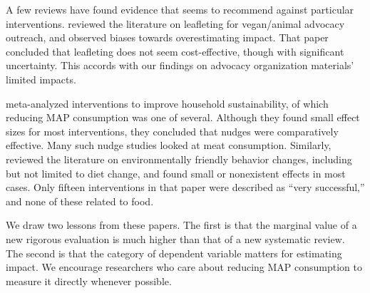 \documentclass[sn-nature,referee,pdflatex]{sn-jnl}
\begin{document}
A few reviews have found evidence that seems to recommend against
particular interventions. \citep{greig2017} reviewed the literature on
leafleting for vegan/animal advocacy outreach, and observed biases
towards overestimating impact. That paper concluded that leafleting does
not seem cost-effective, though with significant uncertainty. This
accords with our findings on advocacy organization materials' limited
impacts.

\citep{nisa2019} meta-analyzed interventions to improve household
sustainability, of which reducing MAP consumption was one of several.
Although they found small effect sizes for most interventions, they
concluded that nudges were comparatively effective. Many such nudge
studies looked at meat consumption. Similarly, \citep{rau2022} reviewed
the literature on environmentally friendly behavior changes, including
but not limited to diet change, and found small or nonexistent effects
in most cases. Only fifteen interventions in that paper were described
as ``very successful,'' and none of these related to food.

We draw two lessons from these papers. The first is that the marginal
value of a new rigorous evaluation is much higher than that of a new
systematic review. The second is that the category of dependent variable
matters for estimating impact. We encourage researchers who care about
reducing MAP consumption to measure it directly whenever possible.

\begin{comment}
First I feel a little strange saying that the marginal value of a review is low (then whay are we writing this paper?) Second, maybe there's a space for discussion about what counts as  meaningful? mention that ease of implementation matters in terms of what’s meaningful. The costs of fully exposing one person is the relevant denominator. The costs of recruitment are part of the cost. Maybe some people are more amenable to nudges after hearing an argument for
\end{comment}

\newpage

\renewcommand\refname{References}

\end{document}
